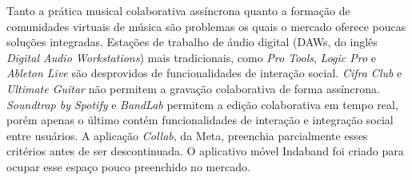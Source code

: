 Tanto a prática musical colaborativa assíncrona quanto a formação de comunidades
virtuais de música são problemas os quais o mercado oferece poucas soluções
integradas. Estações de trabalho de áudio digital (DAWs, do inglês
\textit{Digital Audio Workstations}) mais tradicionais, como \textit{Pro Tools},
\textit{Logic Pro} e \textit{Ableton Live} são desprovidos de funcionalidades de
interação social. \textit{Cifra Club} e \textit{Ultimate Guitar} não permitem a
gravação colaborativa de forma assíncrona. \textit{Soundtrap by Spotify} e
\textit{BandLab} permitem a edição colaborativa em tempo real, porém apenas o
último contém funcionalidades de interação e integração social entre usuários. A
aplicação \textit{Collab}, da Meta, preenchia parcialmente esses critérios antes
de ser descontinuada. O aplicativo móvel Indaband foi criado para ocupar esse
espaço pouco preenchido no mercado.

